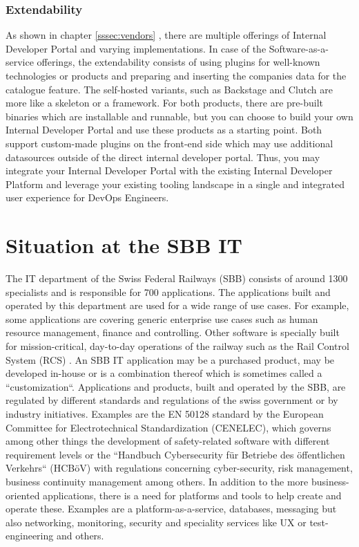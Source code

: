 \documentclass[a4paper,12pt]{article}
\begin{document}
    \subsubsection{Extendability}
    As shown in chapter \ref{sssec:vendors} , there are multiple offerings of Internal Developer Portal and varying
    implementations.
    In case of the Software-as-a-service offerings, the extendability consists of using plugins for well-known
    technologies or products and preparing and inserting the companies data for the catalogue feature.
    The self-hosted variants, such as Backstage and Clutch are more like a skeleton or a framework.
    For both products, there are pre-built binaries which are installable and runnable, but you can choose to build your
    own Internal Developer Portal and use these products as a starting point.
    Both support custom-made plugins on the front-end side which may use additional datasources outside of the direct
    internal developer portal.
    Thus, you may integrate your Internal Developer Portal with the existing Internal Developer Platform and leverage
    your existing tooling landscape in a single and integrated user experience for DevOps Engineers.
    \pagebreak


    \section{Situation at the SBB IT}
    \label{sec:sbbit}
    The IT department of the Swiss Federal Railways (SBB) consists of around 1300 specialists and is responsible for
    700 applications\parencite{sbbitkennzahlen}.
    The applications built and operated by this department are used for a wide range of use cases.
    For example, some applications are covering generic enterprise use cases such as human resource management, finance
    and controlling.
    Other software is specially built for mission-critical, day-to-day operations of the railway such as the Rail Control
    System (RCS)\parencite{sbbrcs} .
    An SBB IT application may be a purchased product, may be developed in-house or is a combination thereof which is
    sometimes called a ``customization``.
    Applications and products, built and operated by the SBB, are regulated by different standards and regulations of the
    swiss government or by industry initiatives.
    Examples are the EN 50128 standard by the European Committee for Electrotechnical Standardization (CENELEC), which
    governs among other things the development of safety-related software with different requirement levels
    or the ``Handbuch Cybersecurity für Betriebe des öffentlichen Verkehrs`` (HCBöV)\parencite{hcboev} with regulations
    concerning cyber-security, risk management, business continuity management among others.
    In addition to the more business-oriented applications, there is a need for platforms and tools to help create
    and operate these.
    Examples are a platform-as-a-service, databases, messaging but also networking, monitoring, security and
    speciality services like UX or test-engineering and others.
\end{document}
